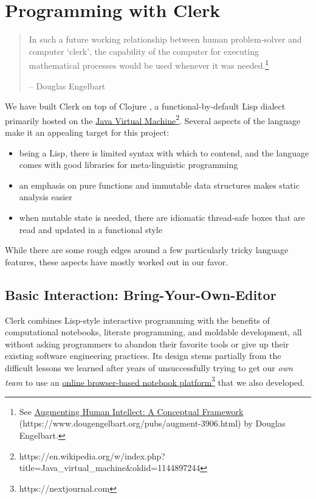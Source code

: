 \documentclass[sigconf,screen]{acmart}
\providecommand{\tightlist}{%
  \setlength{\itemsep}{0pt}\setlength{\parskip}{0pt}}
\begin{document}
\hypertarget{programming-with-clerk}{%
\section{Programming with Clerk}\label{programming-with-clerk}}

\begin{quote}
In such a future working relationship between human problem-solver and computer `clerk', the capability of the computer for executing mathematical processes would be used whenever it was needed.\footnote{See {\href{https://www.dougengelbart.org/pubs/augment-3906.html}{Augmenting Human Intellect: A Conceptual Framework} (https://www.dougengelbart.org/pubs/augment-3906.html)} by Douglas Engelbart.}

-- Douglas Engelbart
\end{quote}

We have built Clerk on top of Clojure \cite{Hickey_2020}, a functional-by-default Lisp dialect primarily hosted on the {\href{https://en.wikipedia.org/w/index.php?title=Java_virtual_machine\&oldid=1144897244}{Java Virtual Machine}\footnote{https://en.wikipedia.org/w/index.php?title=Java\_virtual\_machine\&oldid=1144897244}}. Several aspects of the language make it an appealing target for this project:

\begin{itemize}
\tightlist
\item
  being a Lisp, there is limited syntax with which to contend, and the language comes with good libraries for meta-linguistic programming
\item
  an emphasis on pure functions and immutable data structures makes static analysis easier
\item
  when mutable state is needed, there are idiomatic thread-safe boxes that are read and updated in a functional style
\end{itemize}

While there are some rough edges around a few particularly tricky language features, these aspects have mostly worked out in our favor.

\hypertarget{basic-interaction:-bring-your-own-editor}{%
\subsection{Basic Interaction: Bring-Your-Own-Editor}\label{basic-interaction:-bring-your-own-editor}}

Clerk combines Lisp-style interactive programming with the benefits of computational notebooks, literate programming, and moldable development, all without asking programmers to abandon their favorite tools or give up their existing software engineering practices. Its design stems partially from the difficult lessons we learned after years of unsuccessfully trying to get our \emph{own team} to use an {\href{https://nextjournal.com}{online browser-based notebook platform}\footnote{https://nextjournal.com}} that we also developed.
\end{document}
